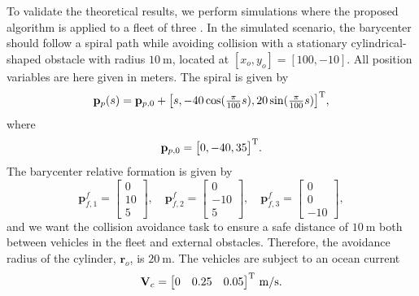 To validate the theoretical results, we perform simulations where the proposed algorithm is applied to a fleet of three  \cite{sousa_LAUV_2012}. In the simulated scenario, the barycenter should follow a spiral path while avoiding collision with a stationary cylindrical-shaped obstacle with radius $\SI{10}{\meter}$, located at $[x_o,y_o] = [100,-10]$. All position variables are here given in meters. The spiral is given by
\begin{equation}
    \mathbf{p}_p(s) = \mathbf{p}_{p,0} + \bigl[s, -40 \cos(\tfrac{\pi}{100} s), 20 \sin(\tfrac{\pi}{100} s)\bigr]^{\mathrm{T}},
\end{equation}
where \begin{equation}
    \mathbf{p}_{p,0} = \bigl[ 0, -40, 35 \bigr]^{\mathrm{T}}.
\end{equation}
The barycenter relative formation is given by
\begin{equation}
    \mathbf{p}_{f,1}^f = \begin{bmatrix}0 \\ 10 \\ 5\end{bmatrix}, \quad \mathbf{p}_{f,2}^f = \begin{bmatrix}0 \\ -10 \\ 5\end{bmatrix},\quad \mathbf{p}_{f,3}^f = \begin{bmatrix}0 \\ 0 \\ -10\end{bmatrix},
\end{equation}
and we want the collision avoidance task to ensure a safe distance of $\SI{10}{\meter}$ both between vehicles in the fleet and external obstacles. Therefore, the avoidance radius of the cylinder, $\mathbf{r}_o$, is $\SI{20}{\meter}$. The vehicles are subject to an ocean current 
\begin{equation}
    \mathbf{V}_c = \begin{bmatrix}
        0 & 0.25 & 0.05
    \end{bmatrix}^{\mathrm{T}} \,\mathrm{m/s}.
\end{equation}

